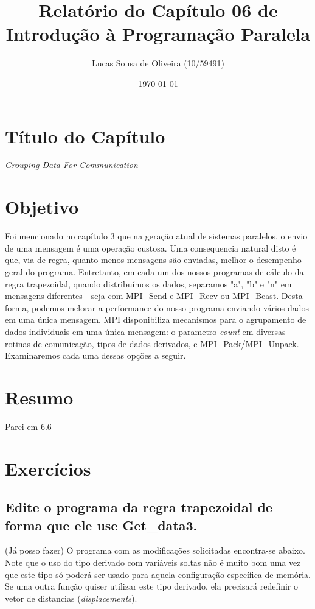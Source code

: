 \documentclass[11pt,a4paper,onecolumn]{article}
\title{Relatório do Capítulo 06 de\\Introdução à Programação Paralela}
\author{Lucas Sousa de Oliveira (10/59491)}
\date{\today}
\begin{document}
\maketitle

\section{Título do Capítulo}
\textit{Grouping Data For Communication}

\section{Objetivo}
Foi mencionado no capítulo 3 que na geração atual de sistemas paralelos, o envio de uma mensagem é uma operação custosa.
Uma consequencia natural disto é que, via de regra, quanto menos mensagens são enviadas, melhor o desempenho geral do programa.
Entretanto, em cada um dos nossos programas de cálculo da regra trapezoidal, quando distribuímos os dados, separamos "a", "b" e "n" em mensagens diferentes - seja com MPI\_Send e MPI\_Recv ou MPI\_Bcast.
Desta forma, podemos melorar a performance do nosso programa enviando vários dados em uma única mensagem.
MPI disponibiliza mecanismos para o agrupamento de dados individuais em uma única mensagem: o parametro \textit{count} em diversas rotinas de comunicação, tipos de dados derivados, e MPI\_Pack/MPI\_Unpack.
Examinaremos cada uma dessas opções a seguir.

\section{Resumo}
\label{sec:resumo}

Parei em 6.6

\section{Exercícios}
\subsection{Edite o programa da regra trapezoidal de forma que ele use Get\_data3.} (Já posso fazer)
O programa com as modificações solicitadas encontra-se abaixo.
Note que o uso do tipo derivado com variáveis soltas não é muito bom uma vez que este tipo só poderá ser usado para aquela configuração específica de memória.
Se uma outra função quiser utilizar este tipo derivado, ela precisará redefinir o vetor de distancias (\textit{displacements}).

\end{document}
